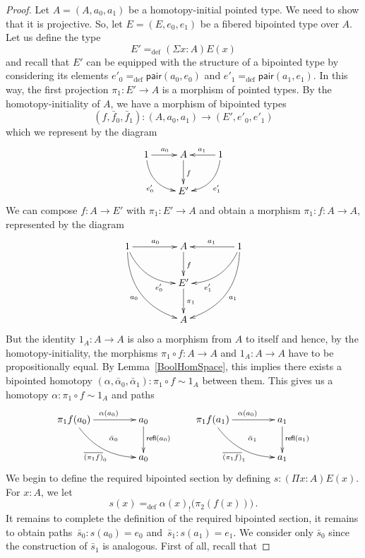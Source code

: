 \documentclass[10pt,a4paper,oneside,reqno]{amsart}
\numberwithin{equation}{section}
\theoremstyle{mythm}
\theoremstyle{mydef}
\theoremstyle{myrmk}
\newcommand{\peq}{=}
\newcommand{\defeq}{=_{\mathrm{def}}}
\newcommand{\co}{\colon}
\newcommand{\pair}{\mathsf{pair}}
\newcommand{\refl}{\mathsf{refl}}
\begin{document}
\begin{proof}
Let $A = (A, a_0, a_1)$ be a homotopy-initial pointed type. We need to show that it is projective. So, let $E = (E, e_0, e_1)$ be a fibered 
bipointed type over $A$. Let us define the type 
\[
E' \defeq (\Sigma x \co A) E(x) 
\]
and recall that $E'$ can be equipped with the structure of a bipointed type by considering its elements $e'_0 \defeq \pair(a_0, e_0)$ and $e'_1 \defeq \pair(a_1, e_1)$. In this way,  the first projection $\pi_1 \co E' \to A$ is a morphism of pointed types. By the homotopy-initiality of $A$, we have a morphism of bipointed types
\[
(f, \bar{f}_0, \bar{f}_1) \co (A, a_0, a_1)  \to (E', e'_0, e'_1) 
\]
which we represent by the diagram
\[
\xymatrix{
1 \ar@/_1pc/[dr]_{e'_0} \ar[r]^{a_0} & A  \ar[d]^f & 1 \ar[l]_{a_1} \ar@/^1pc/[dl]^{e'_1} \\
 & E' & }
 \]
 We can compose $f \co A \to E'$ with $\pi_1 \co E' \to A$ and obtain a morphism $\pi_1 \co f \co A \to A$, represented by the diagram
  \[
\xymatrix@C=1.5cm{
1 \ar@/_1pc/[dr]_(.7){e'_0} \ar[r]^{a_0} \ar@/_1.5pc/[ddr]_{a_0}  & A  \ar[d]^f & 1 \ar[l]_{a_1} \ar@/^1pc/[dl]^(.7){e'_1} \ar@/^1.5pc/[ddl]^{a_1}  \\
 & E' \ar[d]^{\pi_1} & \\
 & A &  }
 \]
But the identity $1_A \co A \to A$ is also a morphism from $A$ to itself and hence, by the homotopy-initiality, the morphisms $\pi_1 \circ f \co A \to A$
and $1_A \co A \to A$ have to be propositionally equal. By Lemma~\ref{BoolHomSpace}, this implies there exists a bipointed homotopy $(\alpha,
\bar{\alpha}_0,\bar{\alpha}_1) \co \pi_1 \circ f \sim 1_A$ between them. This gives us a homotopy $\alpha \co \pi_1 \circ f \sim 1_A$ and paths
\[
\xymatrix@C=1.5cm{
\pi_1 f (a_0) \ar[r]^{\alpha(a_0)} \ar@/_1pc/[dr]_{\overline{(\pi_1 f)}_0} \ar@{}[dr]|{\quad \bar{\alpha}_0}  & a_0 \ar[d]^{\refl(a_0)} \\
 & a_0 } \qquad
 \xymatrix@C=1.5cm{
\pi_1 f (a_1) \ar[r]^{\alpha(a_0)} \ar@/_1pc/[dr]_{\overline{(\pi_1 f)}_1} \ar@{}[dr]|{\quad \bar{\alpha}_1}  & a_1 \ar[d]^{\refl(a_1)} \\
 & a_1 }
\]
We begin to define the required bipointed section by defining  $s \co (\Pi x \co A) E(x)$. For $x \co A$, we let
\begin{equation}
\label{equ:defreqsection}
s(x) \defeq \alpha(x)_{!} \big( \pi_2(f(x)) \big) \, . 
\end{equation}
It remains to complete the definition of the required bipointed section, it remains to obtain paths~$\bar{s}_0 \co s(a_0)  \peq e_0$ and~$\bar{s}_1 \co s(a_1) \peq e_1$. We consider only $\bar{s}_0$ since the construction of $\bar{s}_1$ is  analogous. First of all, recall that 

\end{proof}
\end{document}
